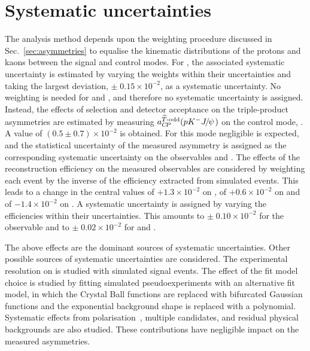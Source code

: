 \section{Systematic uncertainties}
\label{sec:systematics}
The analysis method depends upon the weighting procedure discussed in Sec.~\ref{sec:asymmetries} to equalise the kinematic distributions of the protons and kaons between the signal and control modes. For \DACP, the associated systematic uncertainty is estimated by varying the weights within their uncertainties and taking the largest deviation, $\pm\; 0.15\times 10^{-2}$, as a systematic uncertainty. No weighting is needed for \ACP and \aPTodd, and therefore no systematic uncertainty is assigned.
Instead, the effects of selection and detector acceptance on the triple-product asymmetries are estimated by measuring $a_{C\!P}^{\widehat{T}\text{-odd}}(p{{K}^-}{{J\mskip -3mu/\mskip -2mu\psi\mskip 2mu}})$ on the control mode, \LKJ. A value of $(0.5\pm 0.7)\times 10^{-2}$ is obtained. For this mode negligible \CPV is expected, and the statistical uncertainty of the measured asymmetry is assigned as the corresponding systematic uncertainty on the observables \ACP and \aPTodd.
The effects of the reconstruction efficiency on the measured observables are considered by weighting each event by the inverse of the efficiency extracted from simulated events. This leads to a change in the central values of $+1.3\times 10^{-2}$ on \DACP, of $+0.6\times 10^{-2}$ on \ACP and of $-1.4\times 10^{-2}$ on \aPTodd.
A systematic uncertainty is assigned by varying the efficiencies within their uncertainties. This amounts to $\pm\; 0.10\times 10^{-2}$ for the \DACP observable and to $\pm\; 0.02\times 10^{-2}$ for \ACP and \aPTodd.

The above effects are the dominant sources of systematic uncertainties. Other possible sources of systematic uncertainties are considered. The experimental resolution on \CT is studied with simulated signal events. The effect of the fit model choice is studied by fitting simulated pseudoexperiments with an alternative fit model, in which the Crystal Ball functions are replaced with bifurcated Gaussian functions and the exponential background shape is replaced with a polynomial.
Systematic effects from \Lb polarisation~\cite{LHCb-PAPER-2012-057}, multiple candidates, and residual physical backgrounds are also studied. These contributions have negligible impact on the measured asymmetries.

